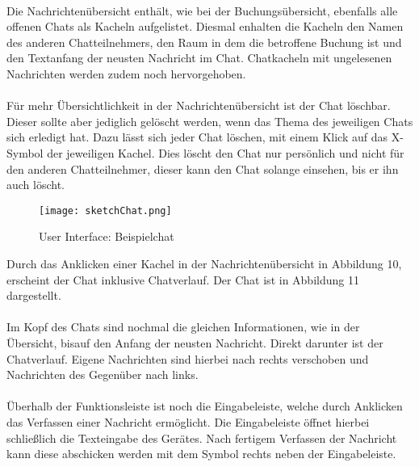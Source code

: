 \paragraph{} Die Nachrichtenübersicht enthält, wie bei der Buchungsübersicht, ebenfalls alle offenen Chats als Kacheln aufgelistet. 
Diesmal enhalten die Kacheln den Namen des anderen Chatteilnehmers, den Raum in dem die betroffene Buchung ist und den Textanfang der neusten Nachricht im Chat.
Chatkacheln mit ungelesenen Nachrichten werden zudem noch hervorgehoben.

\paragraph{} Für mehr Übersichtlichkeit in der Nachrichtenübersicht ist der Chat löschbar.
Dieser sollte aber jediglich gelöscht werden, wenn das Thema des jeweiligen Chats sich erledigt hat.
Dazu lässt sich jeder Chat löschen, mit einem Klick auf das X-Symbol der jeweiligen Kachel.
Dies löscht den Chat nur persönlich und nicht für den anderen Chatteilnehmer, dieser kann den Chat solange einsehen, bis er ihn auch löscht.

\newpage
\begin{wrapfigure}[15]{r}{5.5cm}
  \texttt{[image: sketchChat.png]}
  \caption{User Interface: Beispielchat}
\end{wrapfigure}

Durch das Anklicken einer Kachel in der Nachrichtenübersicht in Abbildung 10, erscheint der Chat inklusive Chatverlauf.
Der Chat ist in Abbildung 11 dargestellt.

\paragraph{} Im Kopf des Chats sind nochmal die gleichen Informationen, wie in der Übersicht, bisauf den Anfang der neusten Nachricht. 
Direkt darunter ist der Chatverlauf.
Eigene Nachrichten sind hierbei nach rechts verschoben und Nachrichten des Gegenüber nach links.

\paragraph{}Überhalb der Funktionsleiste ist noch die Eingabeleiste, welche durch Anklicken das Verfassen einer Nachricht ermöglicht. 
Die Eingabeleiste öffnet hierbei schließlich die Texteingabe des Gerätes.
Nach fertigem Verfassen der Nachricht kann diese abschicken werden mit dem Symbol rechts neben der Eingabeleiste. 

